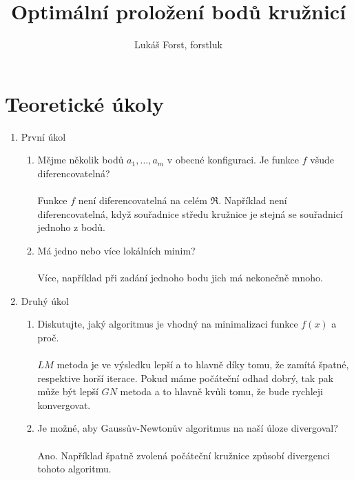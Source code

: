 \documentclass[12pt]{article}
\begin{document}
\title{Optimální proložení bodů kružnicí}
\author{Lukáš Forst, forstluk}
\maketitle

\section{Teoretické úkoly}
\begin{enumerate}
	\item První úkol
	\begin{enumerate}[label=\arabic*)]
		\item
		Mějme několik bodů $a_1, \ldots, a_m$ v obecné konfiguraci.
		Je funkce $ f $ všude diferencovatelná? 
		\\ \\
		Funkce $f$ není diferencovatelná na celém $\Re$. Například není 
		diferencovatelná, když souřadnice středu kružnice je stejná se souřadnicí 
		jednoho z bodů.
		\item
		Má jedno nebo více lokálních minim? 
		\\ \\
		Více, například při zadání jednoho bodu jich má nekonečně mnoho.		
	\end{enumerate}
	\item Druhý úkol
	\begin{enumerate}[label=\arabic*)]
		\item
		Diskutujte, jaký algoritmus je vhodný na minimalizaci funkce $f(x)$ a proč.
		\\ \\
		$LM$ metoda je ve výsledku lepší a to hlavně díky tomu, že zamítá špatné, 	
		respektive horší iterace. Pokud máme počáteční odhad dobrý, tak pak může 
		být lepší $GN$ metoda a to hlavně kvůli tomu, že bude rychleji konvergovat.
		\item
		Je možné, aby Gaussův-Newtonův algoritmus na naší úloze divergoval? 
		\\ \\
		Ano. Například špatně zvolená počáteční kružnice způsobí divergenci tohoto 
		algoritmu.
	\end{enumerate}


\end{enumerate}
\end{document}
